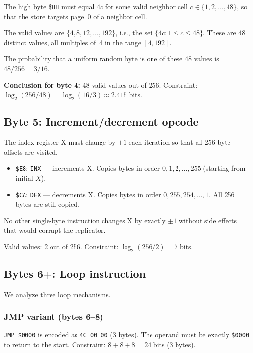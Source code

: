 \documentclass{article}
\newcommand{\hex}[1]{\texttt{\$#1}}
\newcommand{\opcode}[1]{\texttt{#1}}
\begin{document}
The high byte $\hex{HH}$ must equal $4c$ for some valid neighbor
cell $c \in \{1, 2, \ldots, 48\}$, so that the store targets page~0
of a neighbor cell.

The valid values are $\{4, 8, 12, \ldots, 192\}$, i.e., the set
$\{4c : 1 \le c \le 48\}$. These are 48 distinct values, all multiples
of~4 in the range $[4, 192]$.

The probability that a uniform random byte is one of these 48 values is
$48/256 = 3/16$.

\textbf{Conclusion for byte 4:} 48 valid values out of 256.
Constraint: $\log_2(256/48) = \log_2(16/3) \approx 2.415$ bits.

\subsection{Byte 5: Increment/decrement opcode}

The index register X must change by $\pm 1$ each iteration so that all
256 byte offsets are visited.

\begin{itemize}
\item \hex{E8}: \opcode{INX} --- increments X. Copies bytes in order
  $0, 1, 2, \ldots, 255$ (starting from initial $X$).
\item \hex{CA}: \opcode{DEX} --- decrements X. Copies bytes in order
  $0, 255, 254, \ldots, 1$. All 256 bytes are still copied.
\end{itemize}

No other single-byte instruction changes X by exactly $\pm 1$ without
side effects that would corrupt the replicator.

Valid values: 2 out of 256. Constraint:
$\log_2(256/2) = 7$ bits.

\subsection{Bytes 6+: Loop instruction}
\label{sec:loop}

We analyze three loop mechanisms.

\subsubsection{JMP variant (bytes 6--8)}

\opcode{JMP \$0000} is encoded as \texttt{4C 00 00} (3 bytes).
The operand must be exactly \hex{0000} to return to the start.
Constraint: $8 + 8 + 8 = 24$ bits (3 bytes).
\end{document}
